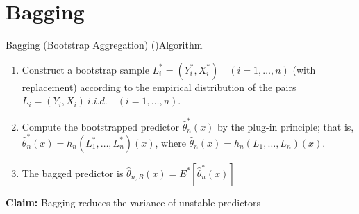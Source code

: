 \documentclass{beamer}
\begin{document}

\section{Bagging}
\begin{frame}{Bagging (Bootstrap Aggregation) (\cite{Breiman1996})}{Algorithm}
\begin{definition} \label{bagging}
	\begin{enumerate}

	\item Construct a bootstrap sample $L_{i}^{*} = (Y_{i}^{*}, X_{i}^{*}) \quad (i = 1, \dots , n)$ (with replacement) according to the empirical distribution of the pairs $L_{i} = (Y_{i}, X_{i}) \: i.i.d. \quad (i = 	1, \dots , n).$
	\item Compute the bootstrapped predictor $\hat{\theta}_{n}^{*}(x)$ by the plug-in principle; that is, $\hat{\theta}_{n}^{*}(x) = h_{n}(L_{1}^{*}, \dots, L_{n}^{*})(x)$, where $\hat{\theta}_{n}(x) = h_{n}(L_{1},\dots, L_{n})(x)$.
	\item The bagged predictor is $\hat{\theta}_{n;B}(x) = E^{*} [\hat{\theta}_{n}^{*}(x)]$

	\end{enumerate}
\end{definition}

\textbf{Claim:} Bagging reduces the variance of unstable predictors


\end{frame}
\end{document}
